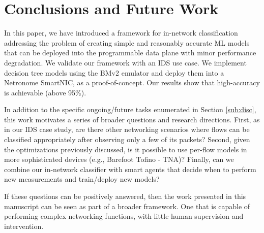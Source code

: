 \section{Conclusions and Future Work}\label{sec:conc}
In this paper, we have introduced a framework for in-network classification addressing the problem of creating simple and reasonably accurate ML models that can be deployed into the programmable data plane with minor performance degradation. We validate our framework with an IDS use case. We implement decision tree models using the BMv2 emulator \cite{p4-bmv2} and deploy them into a Netronome SmartNIC, as a proof-of-concept. Our results show that high-accuracy is achievable (above  95\%). 

In addition to the specific ongoing/future tasks enumerated in Section \ref{sub:disc}, this work motivates a series of broader questions and research directions. 
First, as in our IDS case study, are there other networking scenarios where flows can be classified appropriately after observing only a few of its packets?
Second, given the optimizations previously discussed, is it possible to use per-flow models in more sophisticated devices (e.g., Barefoot Tofino - TNA)?
Finally, can we combine our in-network classifier with smart agents that decide when to perform new measurements and train/deploy new models?

If these questions can be positively answered, then the work presented in this manuscript can be seen as part of a broader framework. One that is capable of performing complex networking functions, with little human supervision and intervention. %


